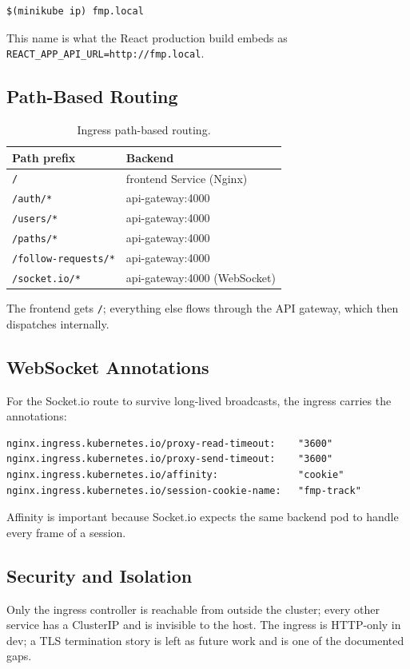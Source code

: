 \documentclass[11pt,a4paper]{article}
\begin{document}
\begin{lstlisting}
$(minikube ip) fmp.local
\end{lstlisting}

This name is what the React production build embeds as
\texttt{REACT\_APP\_API\_URL=http://fmp.local}.

\subsection{Path-Based Routing}
\begin{table}[h]
\centering
\small
\begin{tabular}{l l}
\toprule
\textbf{Path prefix}       & \textbf{Backend} \\
\midrule
\texttt{/}                 & frontend Service (Nginx) \\
\texttt{/auth/*}           & api-gateway:4000 \\
\texttt{/users/*}          & api-gateway:4000 \\
\texttt{/paths/*}          & api-gateway:4000 \\
\texttt{/follow-requests/*}& api-gateway:4000 \\
\texttt{/socket.io/*}      & api-gateway:4000 (WebSocket) \\
\bottomrule
\end{tabular}
\caption{Ingress path-based routing.}
\end{table}

The frontend gets \texttt{/}; everything else flows through the API
gateway, which then dispatches internally.

\subsection{WebSocket Annotations}
For the Socket.io route to survive long-lived broadcasts, the
ingress carries the annotations:

\begin{lstlisting}
nginx.ingress.kubernetes.io/proxy-read-timeout:    "3600"
nginx.ingress.kubernetes.io/proxy-send-timeout:    "3600"
nginx.ingress.kubernetes.io/affinity:              "cookie"
nginx.ingress.kubernetes.io/session-cookie-name:   "fmp-track"
\end{lstlisting}

Affinity is important because Socket.io expects the same backend pod
to handle every frame of a session.

\subsection{Security and Isolation}
Only the ingress controller is reachable from outside the cluster;
every other service has a ClusterIP and is invisible to the host.
The ingress is HTTP-only in dev; a TLS termination story is left as
future work and is one of the documented gaps.
\end{document}

